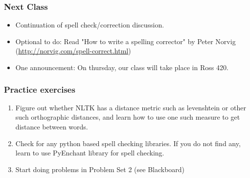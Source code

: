 \documentclass{beamer}
\begin{document}
\begin{frame}
\frametitle{Next Class}
\begin{itemize}
\item Continuation of spell check/correction discussion.
\item Optional to do: Read "How to write a spelling corrector" by Peter Norvig (\url{http://norvig.com/spell-correct.html})
\item One announcement: On thursday, our class will take place in Ross 420. 
\end{itemize}
\end{frame}

\begin{frame}
\frametitle{Practice exercises}
\begin{enumerate}
\item Figure out whether NLTK has a distance metric such as levenshtein or other such orthographic distances, and learn how to use one such measure to get distance between words.
\item Check for any python based spell checking libraries. If you do not find any, learn to use PyEnchant library for spell checking.
\item Start doing problems in Problem Set 2 (see Blackboard)
\end{enumerate}
\end{frame}


\end{document}
